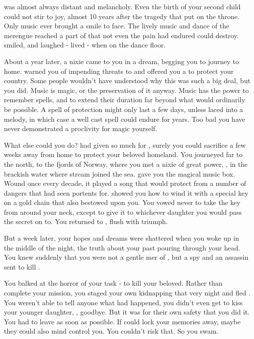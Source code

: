 \documentclass[char]{NeptuneBall}
\begin{document}
\cKing{\King} \cKing{} was almost always distant and melancholy. Even the birth of your second child could not stir \cKing{\them} to joy, almost 10 years after the tragedy that put \cKing{\them} on the throne. Only music ever brought a smile to \cKing{\their} face. The lively music and dance of the merengue reached a part of \cKing{\them} that not even the pain \cKing{\they} had endured could destroy. \cKing{\They} smiled, and laughed - \cKing{\They} lived - when \cKing{\they} \cKing{\were} on the dance floor.

About a year later, a nixie came to you in a dream, begging you to journey to \cNixie{\their} home. \cNixie{\They} warned you of impending threats to \pAtlantis{} and offered you a \iMusicBox{\MYname} to protect your country. Some people wouldn't have understood why this was such a big deal, but you did. Music is magic, or the preservation of it anyway. Music has the power to remember spells, and to extend their duration far beyond what would ordinarily be possible. A spell of protection might only last a few days, unless laced into a melody, in which case a well cast spell could endure for years. Too bad you have never demonstrated a proclivity for magic yourself.

What else could you do? \cKing{} had given so much for \pAtlantis{}, surely you could sacrifice a few weeks away from home to protect your beloved homeland. You journeyed far to the north, to the fjords of Norway, where you met a nixie of great power, \cNixie{\MYname}, in the brackish water where \cNixie{\their} stream joined the sea. \cNixie{} gave you the magical music box. Wound once every decade, it played a song that would protect \pAtlantis{} from a number of dangers that \cNixie{} had seen portents for. \cNixie{\They} showed you how to wind it with a special key on a gold chain that \cNixie{\they} also bestowed upon you. You vowed never to take the key from around your neck, except to give it to whichever daughter you would pass the secret on to. You returned to \pAtlantis{}, flush with triumph.

But a week later, your hopes and dreams were shattered when you woke up in the middle of the night, the truth about your past pouring through your head. You knew suddenly that you were not a gentle mer\cQueen{\human} of \pAtlantis{}, but a spy and an assassin sent to kill \cKing{\King} \cKing{}.

You balked at the horror of your task - to kill your beloved. Rather than complete your mission, you staged your own kidnapping that very night and fled \pAtlantis{}. You weren't able to tell anyone what had happened, you didn't even get to kiss your younger daughter, \cPrincess{}, goodbye. But it was for their own safety that you did it. You had to leave as soon as possible. If \pAssassin{} could lock your memories away, maybe they could also mind control you. You couldn't risk that. So you swam.
\end{document}
